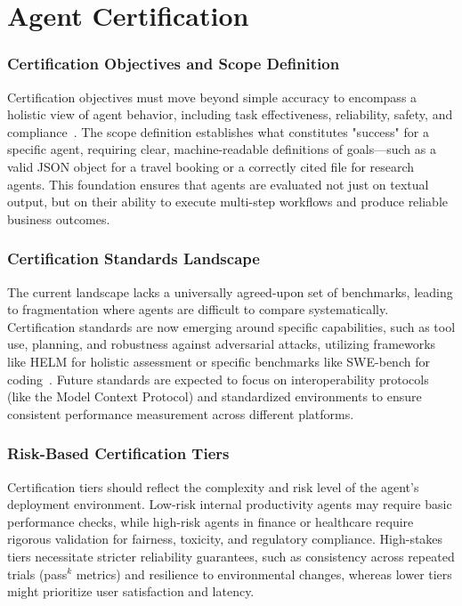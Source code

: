 \part{Agent Certification}
\begin{TNtwocol}
\section{Certification Objectives and Scope Definition}
 Certification objectives must move beyond simple accuracy to encompass a holistic view of agent behavior, including task effectiveness, reliability, safety, and compliance~\cite{Mohammadi_2025}. The scope definition establishes what constitutes "success" for a specific agent, requiring clear, machine-readable definitions of goals—such as a valid JSON object for a travel booking or a correctly cited file for research agents. This foundation ensures that agents are evaluated not just on textual output, but on their ability to execute multi-step workflows and produce reliable business outcomes.
\section{Certification Standards Landscape}
The current landscape lacks a universally agreed-upon set of benchmarks, leading to fragmentation where agents are difficult to compare systematically. Certification standards are now emerging around specific capabilities, such as tool use, planning, and robustness against adversarial attacks, utilizing frameworks like HELM for holistic assessment or specific benchmarks like SWE-bench for coding~\cite{Mohammadi_2025}. Future standards are expected to focus on interoperability protocols (like the Model Context Protocol) and standardized environments to ensure consistent performance measurement across different platforms.
\section{Risk-Based Certification Tiers}
Certification tiers should reflect the complexity and risk level of the agent's deployment environment. Low-risk internal productivity agents may require basic performance checks, while high-risk agents in finance or healthcare require rigorous validation for fairness, toxicity, and regulatory compliance. High-stakes tiers necessitate stricter reliability guarantees, such as consistency across repeated trials (pass$^k$ metrics) and resilience to environmental changes, whereas lower tiers might prioritize user satisfaction and latency.~\cite{Mohammadi_2025}

\end{TNtwocol}
